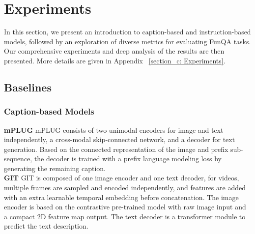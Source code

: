 \section{Experiments}
In this section, we present an introduction to caption-based and instruction-based models, followed by an exploration of diverse metrics for evaluating FunQA tasks. Our comprehensive experiments and deep analysis of the results are then presented. More details are given in Appendix ~\ref{section_c: Experiments}.
\subsection{Baselines}
\subsubsection{Caption-based Models}
\noindent\textbf{mPLUG}\quad
mPLUG \cite{li2022mplug} consists of two unimodal encoders for image and text independently, a cross-modal skip-connected network, and a decoder for text generation. Based on the connected representation of the image and prefix sub-sequence, the decoder is trained with a prefix language modeling loss by generating the remaining caption. \\
\noindent\textbf{GIT}\quad
GIT \cite{wang2022git} is composed of one image encoder and one text decoder, for videos, multiple frames are sampled and encoded independently, and features are added with an extra learnable temporal embedding before concatenation. The image encoder is based on the contrastive pre-trained model \cite{yuan2021florence} with raw image input and a compact 2D feature map output. The text decoder is a transformer module to predict the text description.


